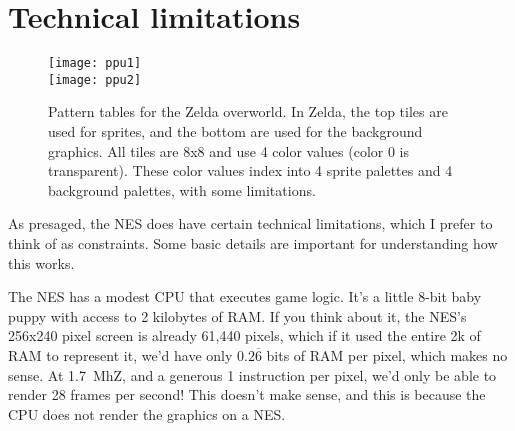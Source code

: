 \documentclass[twocolumn]{article}
\begin{document}
\section{Technical limitations}

\begin{figure}[h!t]
\begin{center}
\texttt{[image: ppu1]} \\
\vspace{1em}
\texttt{[image: ppu2]}
\end{center}\vspace{-0.1in}
\caption{Pattern tables for the Zelda overworld. In Zelda, the top tiles
are used for sprites, and the bottom are used for the background graphics.
All tiles are 8x8 and use 4 color values (color 0 is transparent). These
color values index into 4 sprite palettes and 4 background palettes, with
some limitations.
} \label{fig:ppu}
\end{figure}

As presaged, the NES does have certain technical limitations, which I
prefer to think of as constraints. Some basic details are important
for understanding how this works.

The NES has a modest CPU that executes game logic. It's a little 8-bit
baby puppy with access to 2 kilobytes of RAM. If you think about it,
the NES's 256x240 pixel screen is already 61,440 pixels, which if it
used the entire 2k of RAM to represent it, we'd have only
$0.2\overline{6}$ bits of RAM per pixel, which makes no sense. At
1.7~MhZ, and a generous 1 instruction per pixel, we'd only be able to
render 28 frames per second! This doesn't make sense, and this is
because the CPU does not render the graphics on a NES.
\end{document}
